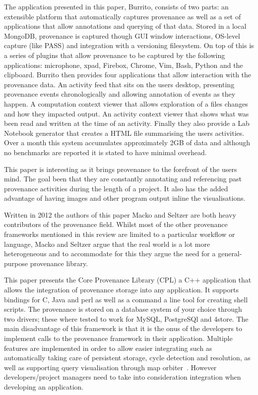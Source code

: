 The application presented in this paper, Burrito, consists of two parts: an extensible platform that automatically captures provenance as well as a set of applications that allow annotations and querying of that data. Stored in a local MongoDB, provenance is captured though GUI window interactions, OS-level capture (like PASS\cite{Muniswamy2006}) and integration with a versioning filesystem. On top of this is a series of plugins that allow provenance to be captured by the following applications: microphone, xpad, Firebox, Chrome, Vim, Bash, Python and the clipboard. Burrito then provides four applications that allow interaction with the provenance data. An activity feed that sits on the users desktop, presenting provenance events chronologically and allowing annotation of events as they happen. A computation context viewer that allows exploration of a files changes and how they impacted output. An activity context viewer that shows what was been read and written at the time of an activity. Finally they also provide a Lab Notebook generator that creates a HTML file summarising the users activities. Over a month this system accumulates approximately 2GB of data and although no benchmarks are reported it is stated to have minimal overhead.

This paper is interesting as it brings provenance to the forefront of the users mind. The goal been that they are constantly annotating and referencing past provenance activities during the length of a project. It also has the added advantage of having images and other program output inline the visualisations.

Written in 2012 the authors of this paper Macko and Seltzer are both heavy contributors of the provenance field. Whilst most of the other provenance frameworks mentioned in this review are limited to a particular workflow or language, Macko and Seltzer argue that the real world is a lot more heterogeneous and to accommodate for this they argue the need for a general-purpose provenance library.

This paper presents the Core Provenance Library (CPL) a C++ application that allows the integration of provenance storage into any application. It supports bindings for C, Java and perl as well as a command a line tool for creating shell scripts. The provenance is stored on a database system of your choice through two drivers; these where tested to work for MySQL, PostgreSQl and 4store. The main disadvantage of this framework is that it is the onus of the developers to implement calls to the provenance framework in their application. Multiple features are implemented in order to allow easier integrating such as automatically taking care of persistent storage, cycle detection and resolution, as well as supporting query visualisation through map orbiter~\cite{Seltzer2011}. However developers/project managers need to take into consideration integration when developing an application.

